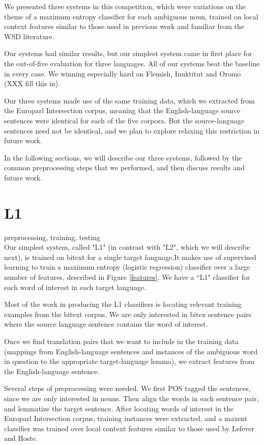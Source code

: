 \documentclass[11pt,letterpaper]{article}
\begin{document}
We presented three systems in this competition, which were variations on the
theme of a maximum entropy classifier for each ambiguous noun, trained on local
context features similar to those used in previous work and familiar from the
WSD literature.

Our systems had similar results, but our simplest system came in first place
for the out-of-five evaluation for three languages. All of our systems beat the
baseline in every case.  We winning especially hard on Flemish, Inuktitut and
Oromo (XXX fill this in).

Our three systems made use of the same training data, which we extracted from
the Europarl Intersection corpus, meaning that the English-language source
sentences were identical for each of the five corpora. But the source-language
sentences need not be identical, and we plan to explore relaxing this
restriction in future work.

In the following sections, we will describe our three systems, followed by the
common preprocessing steps that we performed, and then discuss results and
future work.

\section{L1}
preprocessing, training, testing\\

Our simplest system, called "L1" (in contrast with "L2", which we will describe
next), is trained on bitext for a single target language.It makes use of
supervised learning to train a maximum entropy (logistic regression) classifier
over a large number of features, described in Figure \ref{features}. 
We have a ``L1" classifier for each word of interest in each target language.

Most of the work in producing the L1 classifiers is locating relevant training
examples from the bitext corpus. We are only interested in bitex sentence pairs
where the source language sentence contains the word of interest.

Once we find translation pairs that we want to include in the training data
(mappings from English-language sentences and instances of the ambiguous word
in question to the appropriate target-language lemma), we extract features from
the English-language sentence. 

Several steps of preprocessing were needed. We first POS tagged the sentences, since we are only interested in nouns.
Then align the words in each sentence pair, and lemmatize the target sentence.
After locating words of interest in the
Europarl Intersection corpus, training instances were extracted, and a maxent
classifier was trained over local context features similar to those used by Lefever and
Hoste.
\end{document}

